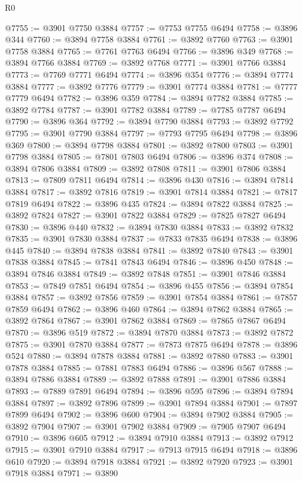 \begin{lexlean}{R0}
\begin{coremodule}
@7755 := @3901 @7750 @3884
@7757 := @7753 @7755 @6494
@7758 := @3896 @344
@7760 := @3894 @7758 @3884
@7761 := @3892 @7760
@7763 := @3901 @7758 @3884
@7765 := @7761 @7763 @6494
@7766 := @3896 @349
@7768 := @3894 @7766 @3884
@7769 := @3892 @7768
@7771 := @3901 @7766 @3884
@7773 := @7769 @7771 @6494
@7774 := @3896 @354
@7776 := @3894 @7774 @3884
@7777 := @3892 @7776
@7779 := @3901 @7774 @3884
@7781 := @7777 @7779 @6494
@7782 := @3896 @359
@7784 := @3894 @7782 @3884
@7785 := @3892 @7784
@7787 := @3901 @7782 @3884
@7789 := @7785 @7787 @6494
@7790 := @3896 @364
@7792 := @3894 @7790 @3884
@7793 := @3892 @7792
@7795 := @3901 @7790 @3884
@7797 := @7793 @7795 @6494
@7798 := @3896 @369
@7800 := @3894 @7798 @3884
@7801 := @3892 @7800
@7803 := @3901 @7798 @3884
@7805 := @7801 @7803 @6494
@7806 := @3896 @374
@7808 := @3894 @7806 @3884
@7809 := @3892 @7808
@7811 := @3901 @7806 @3884
@7813 := @7809 @7811 @6494
@7814 := @3896 @430
@7816 := @3894 @7814 @3884
@7817 := @3892 @7816
@7819 := @3901 @7814 @3884
@7821 := @7817 @7819 @6494
@7822 := @3896 @435
@7824 := @3894 @7822 @3884
@7825 := @3892 @7824
@7827 := @3901 @7822 @3884
@7829 := @7825 @7827 @6494
@7830 := @3896 @440
@7832 := @3894 @7830 @3884
@7833 := @3892 @7832
@7835 := @3901 @7830 @3884
@7837 := @7833 @7835 @6494
@7838 := @3896 @445
@7840 := @3894 @7838 @3884
@7841 := @3892 @7840
@7843 := @3901 @7838 @3884
@7845 := @7841 @7843 @6494
@7846 := @3896 @450
@7848 := @3894 @7846 @3884
@7849 := @3892 @7848
@7851 := @3901 @7846 @3884
@7853 := @7849 @7851 @6494
@7854 := @3896 @455
@7856 := @3894 @7854 @3884
@7857 := @3892 @7856
@7859 := @3901 @7854 @3884
@7861 := @7857 @7859 @6494
@7862 := @3896 @460
@7864 := @3894 @7862 @3884
@7865 := @3892 @7864
@7867 := @3901 @7862 @3884
@7869 := @7865 @7867 @6494
@7870 := @3896 @519
@7872 := @3894 @7870 @3884
@7873 := @3892 @7872
@7875 := @3901 @7870 @3884
@7877 := @7873 @7875 @6494
@7878 := @3896 @524
@7880 := @3894 @7878 @3884
@7881 := @3892 @7880
@7883 := @3901 @7878 @3884
@7885 := @7881 @7883 @6494
@7886 := @3896 @567
@7888 := @3894 @7886 @3884
@7889 := @3892 @7888
@7891 := @3901 @7886 @3884
@7893 := @7889 @7891 @6494
@7894 := @3896 @595
@7896 := @3894 @7894 @3884
@7897 := @3892 @7896
@7899 := @3901 @7894 @3884
@7901 := @7897 @7899 @6494
@7902 := @3896 @600
@7904 := @3894 @7902 @3884
@7905 := @3892 @7904
@7907 := @3901 @7902 @3884
@7909 := @7905 @7907 @6494
@7910 := @3896 @605
@7912 := @3894 @7910 @3884
@7913 := @3892 @7912
@7915 := @3901 @7910 @3884
@7917 := @7913 @7915 @6494
@7918 := @3896 @610
@7920 := @3894 @7918 @3884
@7921 := @3892 @7920
@7923 := @3901 @7918 @3884
@7971 := @3890

\end{coremodule}
\end{lexlean}
